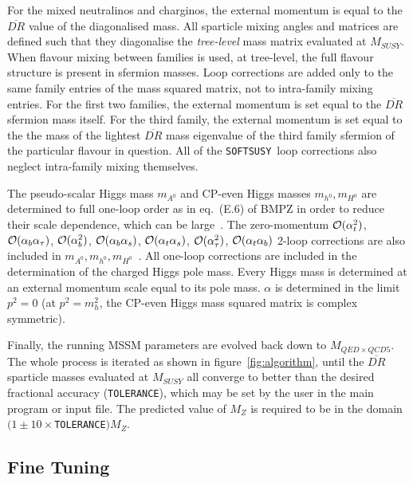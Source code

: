 \documentclass{article}
\def\at{\alpha_t}
\def\ab{\alpha_b}
\def\as{\alpha_s}
\def\atau{\alpha_{\tau}}
\def\oatab{{\cal O}(\at\ab)}
\def\oatas{{\cal O}(\at\as)}
\def\oabas{{\cal O}(\ab\as)}
\def\oatq{{\cal O}(\at^2)}
\def\oabq{{\cal O}(\ab^2)}
\def\oatauq{{\cal O}(\atau^2)}
\def\oabatau{{\cal O}(\ab \atau)}
\def\SOFTSUSY{{\tt SOFTSUSY}}
\def\code#1{\small{\tt #1}\normalsize}
\begin{document}
For the mixed neutralinos and charginos, the
external momentum is equal to the $\overline{DR}$ value of the diagonalised
mass.
All sparticle mixing angles and matrices are defined such that they diagonalise
the {\em tree-level} mass matrix evaluated at $M_{SUSY}$. 
When flavour mixing between families is used, at
tree-level, the full flavour structure is present in sfermion masses.
Loop corrections are added only to the same family entries of the mass squared
matrix, not to
intra-family mixing entries. For the first two families, 
the external momentum is set equal to the $\overline{DR}$ sfermion mass
itself. For the third 
family, the external momentum is set equal to the the mass of the lightest
$\overline{DR}$ mass eigenvalue of the third family sfermion of the particular
flavour in question. 
All of the \SOFTSUSY~loop
corrections also neglect intra-family mixing themselves.

The pseudo-scalar Higgs  mass $m_{A^0}$ and CP-even Higgs masses $m_{h^0},
m_{H^0}$ are determined to full one-loop order
as in eq.~(E.6) of BMPZ in order to reduce
their scale dependence, which can be large~\cite{Katsikatsou:2000cd}. 
The zero-momentum $\oatq$, $\oabatau$, $\oabq$, $\oabas$, $\oatas$, $\oatauq$,
$\oatab$
2-loop corrections are 
also included in $m_{A^0}, m_{h^0},
m_{H^0}$~\cite{Degrassi:2001yf,Brignole:2001jy,Brignole:2002bz,Dedes:2003km}.
All one-loop corrections are included in
the determination of the charged Higgs pole mass.
Every Higgs mass is determined at an external momentum scale equal to its
pole mass. $\alpha$ is determined in the limit $p^2=0$ (at $p^2=m_h^2$, the
CP-even Higgs mass squared matrix is complex symmetric).

Finally, the running MSSM parameters are evolved back down to $M_{QED \times QCD5}$.
The whole process is iterated as shown in figure~\ref{fig:algorithm}, until the
$\overline{DR}$ sparticle masses evaluated at $M_{SUSY}$
all converge to better than the desired fractional accuracy
(\code{TOLERANCE}), which may be set by the user in the main program or input
file. The predicted value of $M_Z$ is required to be in the domain
$(1\pm10\times$\code{TOLERANCE}$)M_Z$.

\subsection{Fine Tuning \label{sec:finetune}}
\end{document}
